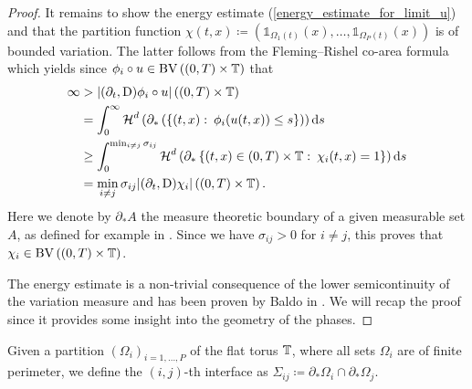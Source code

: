 \begin{proof}
 	It remains to show the energy estimate 
 	(\ref{energy_estimate_for_limit_u}) and that the
 	 partition function $ \chi 
 	( t , x ) \coloneqq \left( \mathds{ 1 }_{ \Omega_{ 1 } ( t )  } ( x ) , 
 	\dotsc, \mathds{ 1 }_{ \Omega_{ P } ( t ) } ( x ) \right) $ is of bounded 
 	variation.
 	The latter follows from the Fleming--Rishel co-area formula \cite{Fleming_Rishel_coarea_formula} which yields since $ \phi_{ i } \circ u \in \operatorname{BV} \left( ( 0 , T ) \times \operatorname{\mathbb{T}} \right) $ that
 	\begin{align*}
 		\infty
 		& >
 		\abs{ 
 			( \partial_{ t } , \operatorname{D} )
 			\phi_{ i } \circ u
 		}
 		\left( ( 0 , T ) \times \operatorname{\mathbb{T}} \right)
 		\\
 		&
 		=
 		\int_{ 0 }^{ \infty }
 			\operatorname{\mathcal{H}}^{ d } \left(
 				\partial_{ \ast } \left(
 					\left\{
 						( t, x ) 
 						\, \colon \,
 						\phi_{ i } ( u ( t , x ) ) \leq s 
 					\right\}
 				 \right)
 			\right)
 		\dd{ s }
 		\\
 		&
 		\geq
 		\int_{ 0 }^{ \min_{ i \neq j } \sigma_{ i j } }
 			\operatorname{\mathcal{H}}^{ d } \left(
 				\partial_{ \ast }
 				\left\{
 					( t , x ) \in ( 0 , T ) \times \operatorname{\mathbb{T}} 
 					\, \colon \,
 					\chi_{ i } ( t , x ) = 1
 				\right\}
 			\right)
 		\dd{ s }
 		\\
 		&=
 		\min_{ i \neq j }
 			\sigma_{ i j }
 		\abs{
 			( \partial_{ t } , \operatorname{D} ) \chi_{ i }
 		}
 		\left(
 			( 0 , T ) \times \operatorname{\mathbb{T}}
 		\right).
 	\end{align*}
 	Here we denote by $ \partial_{ \ast } A $ the measure theoretic boundary of a given measurable set $ A $, as defined for example in \cite[Def.~5.7]{evans_gariepy_measure_theory_and_fine_props}.
 	Since we have $ \sigma_{ i j } > 0 $ for $ i \neq j $, this proves that $ 
 	\chi_{ i } \in \operatorname{BV} \left( ( 0, T ) \times \operatorname{\mathbb{T}} \right) $.
 	
 	The energy estimate is a non-trivial consequence of the lower semicontinuity of the variation measure and has been proven by Baldo in \cite{baldo_minimal_interface_criterion}. We will recap the proof since it provides some insight into the geometry of the phases.
\end{proof}

\begin{definition}
	Given a partition $ \left( \Omega_{ i } \right)_{ i = 1 , \dotsc , P } $ of 
	the flat torus $ \operatorname{\mathbb{T}} $, where all sets $ \Omega_{ i } $ are of 
	finite perimeter, we define the $ (i,j)$-th interface as $ \Sigma_{ i j } 
	\coloneqq \partial_{ \ast } \Omega_{ i } \cap \partial_{ \ast } \Omega_{ j 
	} $.
\end{definition}

